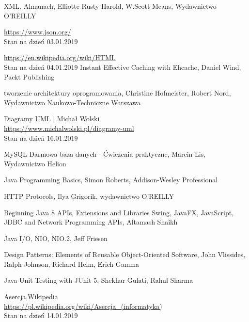 \documentclass[12pt, twoside]{report}
\begin{document}
\begin{thebibliography}{9}
XML. Almanach, Elliotte Rusty Harold, W.Scott Means, Wydawnictwo O'REILLY

  \url{https://www.json.org/} \\
  Stan na dzień 03.01.2019

	\url{https://en.wikipedia.org/wiki/HTML} \\
	Stan na dzień 04.01.2019
Instant Effective Caching with Ehcache, Daniel Wind, Packt Publishing


tworzenie architektury oprogramowania, Christine Hofmeister, Robert Nord, Wydawnictwo Naukowo-Techniczne Warszawa

	Diagramy UML | Michał Wolski\\ \url{https://www.michalwolski.pl/diagramy-uml} \\
	Stan na dzień 16.01.2019
	
MySQL Darmowa baza danych - Ćwiczenia praktyczne, Marcin Lis, Wydawnictwo Helion

Java Programming Basics, Simon Roberts, Addison-Wesley Professional

HTTP Protocols, Ilya Grigorik, wydawnictwo O'REILLY

Beginning Java 8 APIs, Extensions and Libraries Swing, JavaFX, JavaScript, JDBC and Network Programming APIs, Altamash Shaikh

Java I/O, NIO, NIO.2, Jeff Friesen

Design Patterns: Elements of Reusable Object-Oriented Software, John Vlissides, Ralph Johnson, Richard Helm, Erich Gamma

Java Unit Testing with JUnit 5, Shekhar Gulati, Rahul Sharma

Asercja,Wikipedia \\
\url{https://pl.wikipedia.org/wiki/Asercja_(informatyka)} \\
Stan na dzień 14.01.2019

\end{thebibliography}
\end{document}
